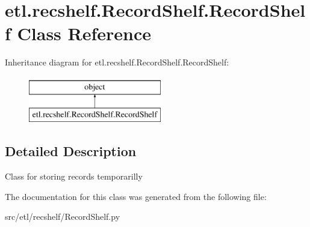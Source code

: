 \hypertarget{classetl_1_1recshelf_1_1RecordShelf_1_1RecordShelf}{\section{etl.\-recshelf.\-Record\-Shelf.\-Record\-Shelf Class Reference}
\label{classetl_1_1recshelf_1_1RecordShelf_1_1RecordShelf}
}
Inheritance diagram for etl.\-recshelf.\-Record\-Shelf.\-Record\-Shelf\-:\begin{figure}[H]
\begin{center}
\leavevmode
\includegraphics[height=2.000000cm]{classetl_1_1recshelf_1_1RecordShelf_1_1RecordShelf}
\end{center}
\end{figure}


\subsection{Detailed Description}
\begin{DoxyVerb}Class for storing records temporarilly\end{DoxyVerb}
 

The documentation for this class was generated from the following file\-:\begin{DoxyCompactItemize}
\item 
src/etl/recshelf/Record\-Shelf.\-py\end{DoxyCompactItemize}
